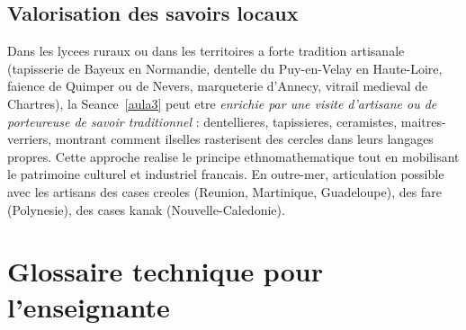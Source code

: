 \documentclass[12pt,a4paper]{scrartcl}
\begin{document}
\subsection{Valorisation des savoirs locaux}
Dans les lycees ruraux ou dans les territoires a forte tradition artisanale (tapisserie de Bayeux en Normandie, dentelle du Puy-en-Velay en Haute-Loire, faience de Quimper ou de Nevers, marqueterie d'Annecy, vitrail medieval de Chartres), la Seance~\ref{aula3} peut etre \emph{enrichie par une visite d'artisan\textperiodcentered e ou de porteur\textperiodcentered euse de savoir traditionnel} : dentellieres, tapissieres, ceramistes, maitres-verriers, montrant comment ils\textperiodcentered elles rasterisent des cercles dans leurs langages propres. Cette approche realise le principe ethnomathematique tout en mobilisant le patrimoine culturel et industriel francais. En outre-mer, articulation possible avec les artisans des cases creoles (Reunion, Martinique, Guadeloupe), des fare (Polynesie), des cases kanak (Nouvelle-Caledonie).

\newpage
\section{Glossaire technique pour l'enseignant\textperiodcentered e}\label{ap:glos}
\end{document}
